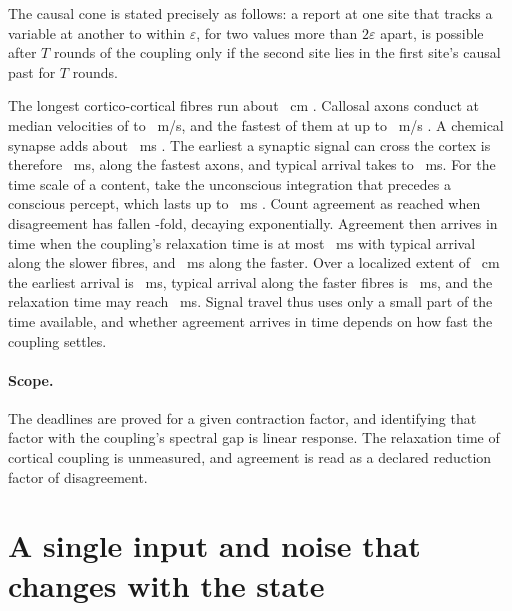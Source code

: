 \documentclass[12pt]{article}
\begin{document}
The causal cone is stated precisely as follows: a report at one site that tracks
a variable at another to within $\varepsilon$, for two values more than
$2\varepsilon$ apart, is possible after $T$ rounds of the coupling only if the
second site lies in the first site's causal past for $T$ rounds.

The longest cortico-cortical fibres run
about \ueFibreCm{}~cm \citep{nunez2014}. Callosal axons conduct at median
velocities of \ueVelocitySlow{} to \ueVelocityFast{}~m/s, and the fastest of
them at up to \ueVelocityMax{}~m/s \citep{caminiti2009}. A chemical synapse
adds about \ueSynapseMs{}~ms \citep{katz1965,sabatini1996}. The earliest a
synaptic signal can cross the cortex is therefore \ueConeMaxMs{}~ms, along the
fastest axons, and typical arrival takes \ueConeFastMs{} to \ueConeSlowMs{}~ms.
For the time scale of a content, take the unconscious integration that precedes
a conscious percept, which lasts up to \ueContentMs{}~ms \citep{herzog2016}.
Count agreement as reached when disagreement has fallen \ueReduction{}-fold,
decaying exponentially. Agreement then arrives in time when the coupling's relaxation
time is at most \ueTauSlowMs{}~ms with typical arrival along the slower fibres,
and \ueTauFastMs{}~ms along the faster. Over a localized extent of
\ueLocalCm{}~cm the earliest arrival is \ueConeLocalMaxMs{}~ms, typical arrival
along the faster fibres is \ueConeLocalFastMs{}~ms, and the relaxation time may
reach \ueTauLocalMs{}~ms. Signal travel thus uses only a small
part of the time available, and whether agreement arrives in time depends on how fast
the coupling settles.

\paragraph{Scope.} The deadlines are proved for a given contraction
factor, and identifying that factor with the coupling's spectral gap is linear
response. The relaxation time of cortical coupling is unmeasured, and agreement
is read as a declared reduction factor of disagreement.

\section{A single input and noise that changes with the state}
\label{app:noise}
\end{document}
